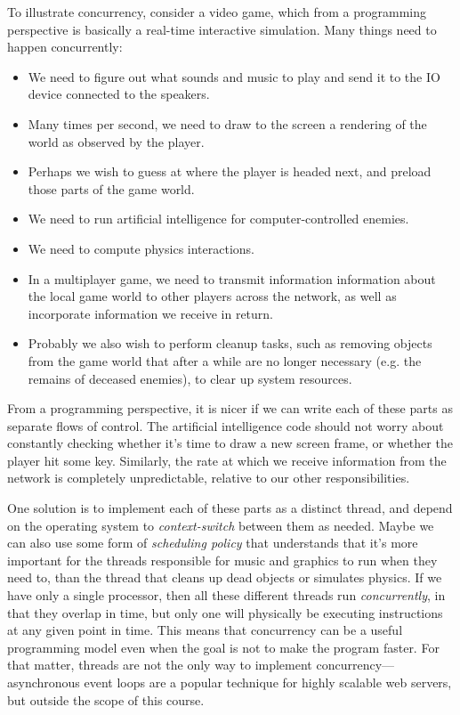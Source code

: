 To illustrate concurrency, consider a video game, which from a
programming perspective is basically a real-time interactive
simulation.  Many things need to happen concurrently:

\begin{itemize}
\item We need to figure out what sounds and music to play and send it
  to the IO device connected to the speakers.
\item Many times per second, we need to draw to the screen a rendering
  of the world as observed by the player.
\item Perhaps we wish to guess at where the player is headed next, and
  preload those parts of the game world.
\item We need to run artificial intelligence for computer-controlled
  enemies.
\item We need to compute physics interactions.
\item In a multiplayer game, we need to transmit information
  information about the local game world to other players across the
  network, as well as incorporate information we receive in return.
\item Probably we also wish to perform cleanup tasks, such as removing
  objects from the game world that after a while are no longer
  necessary (e.g. the remains of deceased enemies), to clear up system
  resources.
\end{itemize}

From a programming perspective, it is nicer if we can write each of
these parts as separate flows of control. The artificial intelligence
code should not worry about constantly checking whether it's time to
draw a new screen frame, or whether the player hit some key.
Similarly, the rate at which we receive information from the network
is completely unpredictable, relative to our other responsibilities.

One solution is to implement each of these parts as a distinct thread,
and depend on the operating system to \emph{context-switch} between
them as needed. Maybe we can also use some form of \emph{scheduling
  policy} that understands that it's more important for the threads
responsible for music and graphics to run when they need to, than the
thread that cleans up dead objects or simulates physics. If we have
only a single processor, then all these different threads run
\emph{concurrently}, in that they overlap in time, but only one will
physically be executing instructions at any given point in time. This
means that concurrency can be a useful programming model even when the
goal is not to make the program faster. For that matter, threads are
not the only way to implement concurrency---asynchronous event loops
are a popular technique for highly scalable web servers, but outside
the scope of this course.

